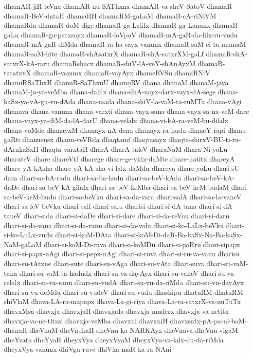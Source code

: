 {dhamAR-jiR-teVna
dhamAR-nu-SAThxna
dhamAR-va-sheV-SatoV
dhamaR
dhamaR-BeV-dataH
dhamaRH
dhamaRM-gaLaM
dhamaR-cA-riNiVM
dhamaRda
dhamaR-doM-dige
dhamaR-ga-Lalilx
dhamaR-ga-Lanunx
dhamaR-gaLu
dhamaR-gu-patxsayx
dhamaR-loVpoV
dhamaR-mA-gaR-da-lilx-ru-vudu
dhamaR-mA-gaR-diMda
dhamaR-ra-ha-sayx-vanunx
dhamaR-saM-ci-ta-mumaM
dhamaR-saM-hite
dhamaR-shAsatxrX
dhamaR-shA-satxrXM-gaLf
dhamaR-shA-satxrX-kA-raru
dhamaRshacx
dhamaR-shiV-lA-veY-shAnAyxM
dhamaR-tatatxvX
dhamaR-vanunx
dhamaR-vayAyx
dhameRVSu
dhamiRNiV
dhamiRSaThxH
dhamiR-SaThxnU
dhamoRV
dhana
dhanaM
dhanaM-jaya
dhanaM-ja-ya-veMba
dhana-dalilx
dhana-dhA-nayx-darx-vayx-dA-sege
dhana-kaSx-ya-vA-gu-vu-dAda
dhana-mada
dhana-shiV-la-vaM-ta-ruMTu
dhana-vAgi
dhanava
dhana-vanunx
dhana-varxti
dhana-vayx-sana
dhana-vayx-sa-na-veM-dare
dhana-vayx-ya-diM-da-lA-darU
dhana-velalx
dhana-vi-kA-ra-veM-bu-dilalx
dhana-voMde
dhanayxM
dhanayx-nA-denu
dhanayx-ra-hudu
dhaneY-rapi
dhanu-gaRti
dhanususx
dhanu-veVRda
dhaqtamf
dhaqtasayx
dhaqta-shirxV-BU-ti-ru-dArxkaSxH
dhaqta-varxtaH
dharA
dharA-taleV
dharaNaM
dhara-Ni-yoLu
dharateV
dhare
dhareVtf
dharege
dhare-ge-yidx-daMte
dhare-hatitx
dhareyA
dhare-yA-kAsha
dhare-yA-kA-sha-vi-lalx-daMdu
dhareya
dhare-yoLu
dhari-sU-dara
dhari-sa-bA-radu
dhari-sa-ba-hudu
dhari-sa-beV-kAda
dhari-sa-beV-kA-daDe
dhari-sa-beV-kA-gilalx
dhari-sa-beV-keMba
dhari-sa-beV-keM-budaM
dhari-sa-beV-keM-budu
dhari-sa-beVku
dhari-sa-da-vara
dhari-salA
dhari-sa-la-vaneV
dhari-sa-leV-beVku
dhari-salf
dhari-salu
dharisi
dhari-si-dA-tana
dhari-si-dA-taneV
dhari-sida
dhari-si-daDe
dhari-si-dare
dhari-si-da-reVnu
dhari-si-daru
dhari-si-da-vana
dhari-si-da-vanu
dhari-si-da-volu
dhari-si-ko-LaLx-beVku
dhari-si-ko-LuLx-vudu
dhari-si-koM-DAta
dhari-si-koM-Di-daR-Ba-kaSx-Na-Ba-kaSx-NaM-gaLaM
dhari-si-koM-Di-ruva
dhari-si-koMDu
dhari-si-paRru
dhari-sipapx
dhari-si-papx-nAgi
dhari-si-pepx-nAgi
dhari-si-ruva
dhari-si-ru-va-vanu
dharisu
dhari-su-tAtxne
dhari-sute
dhari-su-vAga
dhari-su-vAta
dhari-suva
dhari-su-vaM-taha
dhari-su-vaM-ta-hadudx
dhari-su-va-dayAyx
dhari-su-vaneV
dhari-su-va-relalx
dhari-su-va-vanu
dhari-su-vudA
dhari-su-vu-da-riMda
dhari-su-vu-dayAyx
dhari-su-vu-deMdu
dhari-su-vudeV
dhari-su-vudu
dhashipu
dhatuRM
dhatuRM-shiVlaM
dhava-LA-ra-mapapx
dhava-La-gi-riya
dhava-La-va-satxrX-va-nuTuTx
dhavxMsa
dhavxja
dhavxjaH
dhavxjada
dhavxja-muderx
dhavxja-va-netitx
dhavxja-va-ne-titxsi
dhavxja-veMba
dhavxni
dhavxniH
dhavxsatx-pA-pa-ni-baM-dhanaH
dheVnuM
dheVnukaH
dheVnu-ka-NARKAyx
dheVnuva
dheVnu-vigaM
dheYvata
dheYyaR
dheyxVya
dheyxVyaM
dheyxVya-va-lalx-du-da-riMda
dheyxVya-vanunx
dhiVgu-ruve
dhiVka-maR-ka-ra-NAni
}
